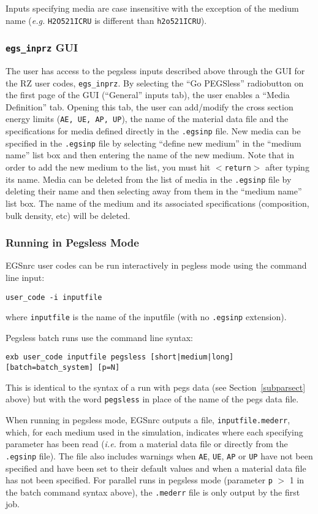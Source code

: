 \documentclass[12pt,twoside]{article}  %
\begin{document}
Inputs specifying media are case insensitive with the exception of the medium name ({\it e.g.} {\tt H2O521ICRU} is
different than {\tt h2o521ICRU}).

\subsubsection{{\tt egs\_inprz} GUI}
The user has access to the pegsless inputs described above through the GUI for the RZ user codes, {\tt egs\_inprz}.
By selecting the ``Go PEGSless'' radiobutton on the first page of the GUI (``General'' inputs tab), the user enables
a ``Media Definition'' tab.  Opening this tab, the user can add/modify the cross section energy limits ({\tt AE, UE, AP, UP}),
the name of the material data file and the specifications for media defined directly in the {\tt .egsinp} file.  New media
can be specified in the {\tt .egsinp} file by selecting ``define new medium'' in the ``medium name'' list box and then entering the
name of the new medium.  Note that in order to add the new medium to the list, you must hit {\tt $<$return$>$} after
typing its name.  Media can be deleted from the list of media in the {\tt .egsinp} file by deleting their name and then
selecting away from them in the ``medium name'' list box.  The name of the medium and its associated specifications
(composition, bulk density, etc) will be deleted.

\subsubsection{Running in Pegsless Mode}

EGSnrc user codes can be run interactively in pegless mode using the command line input:
\begin{verbatim}
user_code -i inputfile
\end{verbatim}
where {\tt inputfile} is the name of the inputfile (with no
{\tt .egsinp} extension).

Pegsless batch runs use the command line syntax:
\begin{verbatim}
exb user_code inputfile pegsless [short|medium|long] [batch=batch_system] [p=N]
\end{verbatim}
This is identical to the syntax of a run with pegs data (see Section~\ref{subparsect} above) but
with the word {\tt pegsless} in place of the name of the pegs data file.

When running in pegsless mode, EGSnrc outputs a file, {\tt inputfile.mederr}, which, for each medium used
in the simulation, indicates where each specifying parameter has been read ({\it i.e.} from a material data
file or directly from the {\tt .egsinp} file).  The file also includes warnings when {\tt AE}, {\tt UE},
{\tt AP} or {\tt UP} have not been specified and have been set to their default values and when a material
data file has not been specified.  For parallel runs in pegsless mode (parameter {\tt p} $>$ 1 in the batch
command syntax above), the {\tt .mederr} file is only output by the first job.
\end{document}
